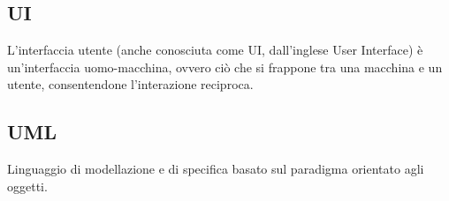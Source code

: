 \documentclass[../glossario.tex]{subfiles}
\begin{document}
\subsection*{UI}
L'interfaccia utente (anche conosciuta come UI, dall'inglese User Interface) è un'interfaccia uomo-macchina, ovvero ciò che si frappone tra una macchina e un utente, consentendone l'interazione reciproca.


\subsection*{UML}
Linguaggio di modellazione e di specifica basato sul paradigma orientato agli oggetti.

    
\end{document}
